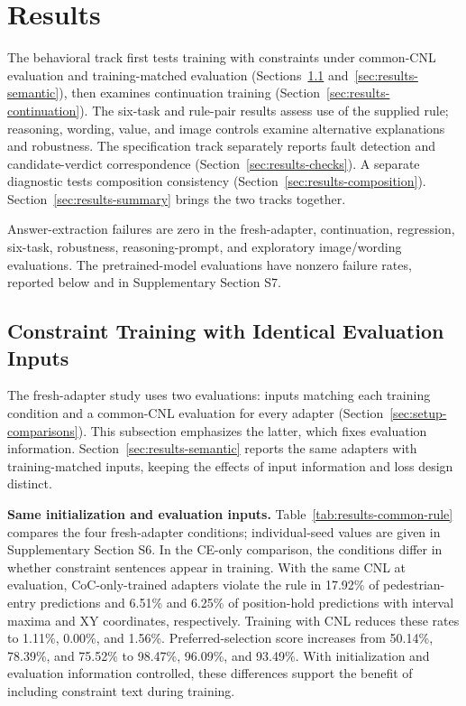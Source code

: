 \section{Results}\label{sec:results}

The behavioral track first tests training with constraints under common-CNL
evaluation and training-matched evaluation
(Sections~\ref{sec:results-training} and~\ref{sec:results-semantic}), then
examines continuation training (Section~\ref{sec:results-continuation}).
The six-task and rule-pair results assess use of the supplied rule; reasoning,
wording, value, and image controls examine alternative explanations and
robustness. The specification track separately reports fault detection and
candidate-verdict correspondence (Section~\ref{sec:results-checks}). A separate diagnostic tests composition
consistency (Section~\ref{sec:results-composition}).
Section~\ref{sec:results-summary} brings the two tracks together.

Answer-extraction failures are zero in the fresh-adapter, continuation,
regression, six-task, robustness, reasoning-prompt, and exploratory
image/wording evaluations. The pretrained-model evaluations have nonzero
failure rates, reported below and in Supplementary Section S7.

\subsection{Constraint Training with Identical Evaluation Inputs}\label{sec:results-training}

The fresh-adapter study uses two evaluations: inputs matching each training
condition and a common-CNL evaluation for every adapter
(Section~\ref{sec:setup-comparisons}). This subsection emphasizes the latter,
which fixes evaluation information. Section~\ref{sec:results-semantic} reports
the same adapters with training-matched inputs, keeping the effects of input
information and loss design distinct.

\noindent\textbf{Same initialization and evaluation inputs.}
Table~\ref{tab:results-common-rule} compares the four fresh-adapter conditions;
individual-seed values are given in Supplementary Section S6. In the CE-only
comparison, the conditions differ in whether constraint sentences appear in
training. With the same CNL at evaluation, CoC-only-trained adapters violate
the rule in 17.92\% of pedestrian-entry predictions and 6.51\% and 6.25\% of
position-hold predictions with interval maxima and XY coordinates, respectively.
Training with CNL reduces these rates to 1.11\%, 0.00\%, and 1.56\%.
Preferred-selection score increases from 50.14\%, 78.39\%, and 75.52\% to 98.47\%, 96.09\%,
and 93.49\%. With initialization and evaluation information controlled, these
differences support the benefit of including constraint text during training.

